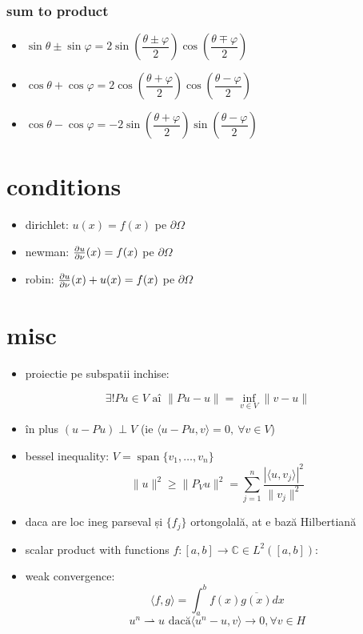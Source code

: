 \documentclass[11pt]{article}
\begin{document}
\subsubsection*{sum to product}
\label{sec:orgc83b924}
\begin{itemize}
\item \(\sin \theta \pm \sin \varphi = 2 \sin\left( \dfrac{\theta \pm \varphi}{2} \right) \cos\left( \dfrac{\theta \mp \varphi}{2} \right)\)
\item \(\cos \theta + \cos \varphi = 2 \cos\left( \dfrac{\theta + \varphi} {2} \right) \cos\left( \dfrac{\theta - \varphi}{2} \right)\)
\item \(\cos \theta - \cos \varphi = -2\sin\left( \dfrac{\theta + \varphi}{2}\right) \sin\left(\dfrac{\theta - \varphi}{2}\right)\)
\end{itemize}


\section*{conditions}
\label{sec:org2f5f0d7}
\begin{itemize}
\item dirichlet: \(u(x) = f(x)\) pe \(\partial \Omega\)
\item newman: \(\frac{\partial u}{\partial \nu}(x) = f(x)\) pe \(\partial \Omega\)
\item robin: \(\frac{\partial u}{\partial \nu}(x) +u(x) = f(x)\) pe \(\partial \Omega\)
\end{itemize}
\section*{misc}
\label{sec:orgceab0b8}
\begin{itemize}
\item proiectie pe subspatii inchise:
\end{itemize}
\[ \exists ! Pu \in V  \text{ aî } \| P u - u \|  = \inf_{v \in V} \| v - u \| \]
\begin{itemize}
\item în plus \((u-Pu)\perp V\) (ie \(\langle u-Pu, v \rangle = 0,~ \forall v \in V\))
\end{itemize}
\begin{itemize}
\item bessel inequality: \(V = \operatorname{span} \{ v_1,\ldots, v_n \}\)
\[ \| u\|^2 \geq \|P_V u\|^2 = \sum_{j=1}^n \frac{|\langle u, v_j\rangle|^2}{\|v_j\|^2} \]
\item daca are loc ineg parseval și \(\{f_j\}\) ortongolală, at e bază Hilbertiană
\item scalar product with functions \(f: [a,b] \to \mathbb{C} \in L^2([a, b])\):
\item weak convergence:
\[ \langle f, g\rangle = \int_a^b f(x) \overline{g(x)} dx  \]
\[ u^n \rightharpoonup u \text{ dacă} \langle u^n-u, v\rangle \to 0, \forall v \in H \]
\end{itemize}
\end{document}
